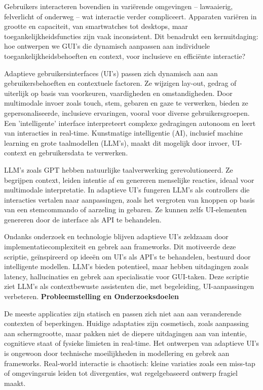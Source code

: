 \documentclass[openany]{book}
\begin{document}
Gebruikers interacteren bovendien in variërende omgevingen – lawaaierig, felverlicht of onderweg – wat interactie verder compliceert. Apparaten variëren in grootte en capaciteit, van smartwatches tot desktops, maar toegankelijkheidsfuncties zijn vaak inconsistent. Dit benadrukt een kernuitdaging: hoe ontwerpen we GUI's die dynamisch aanpassen aan individuele toegankelijkheidsbehoeften en context, voor inclusieve en efficiënte interactie?

Adaptieve gebruikersinterfaces (UI's) passen zich dynamisch aan aan gebruikersbehoeften en contextuele factoren. Ze wijzigen lay-out, gedrag of uiterlijk op basis van voorkeuren, vaardigheden en omstandigheden. Door multimodale invoer zoals touch, stem, gebaren en gaze te verwerken, bieden ze gepersonaliseerde, inclusieve ervaringen, vooral voor diverse gebruikersgroepen. Een 'intelligente' interface interpreteert complexe gedragingen autonoom en leert van interacties in real-time. Kunstmatige intelligentie (AI), inclusief machine learning en grote taalmodellen (LLM's), maakt dit mogelijk door invoer, UI-context en gebruikersdata te verwerken.

LLM's zoals GPT hebben natuurlijke taalverwerking gerevolutioneerd. Ze begrijpen context, leiden intentie af en genereren menselijke reacties, ideaal voor multimodale interpretatie. In adaptieve UI's fungeren LLM's als controllers die interacties vertalen naar aanpassingen, zoals het vergroten van knoppen op basis van een stemcommando of aarzeling in gebaren. Ze kunnen zelfs UI-elementen genereren door de interface als API te behandelen.

Ondanks onderzoek en technologie blijven adaptieve UI's zeldzaam door implementatiecomplexiteit en gebrek aan frameworks. Dit motiveerde deze scriptie, geïnspireerd op ideeën om UI's als API's te behandelen, bestuurd door intelligente modellen. LLM's bieden potentieel, maar hebben uitdagingen zoals latency, hallucinaties en gebrek aan specialisatie voor GUI-taken. Deze scriptie ziet LLM's als contextbewuste assistenten die, met begeleiding, UI-aanpassingen verbeteren.
\newpage
\textbf{Probleemstelling en Onderzoeksdoelen}

De meeste applicaties zijn statisch en passen zich niet aan aan veranderende contexten of beperkingen. Huidige adaptaties zijn cosmetisch, zoals aanpassing aan schermgrootte, maar pakken niet de diepere uitdagingen aan van intentie, cognitieve staat of fysieke limieten in real-time.
Het ontwerpen van adaptieve UI's is ongewoon door technische moeilijkheden in modellering en gebrek aan frameworks. Real-world interactie is chaotisch: kleine variaties zoals een miss-tap of omgevingsruis leiden tot divergenties, wat regelgebaseerd ontwerp fragiel maakt.
\end{document}
